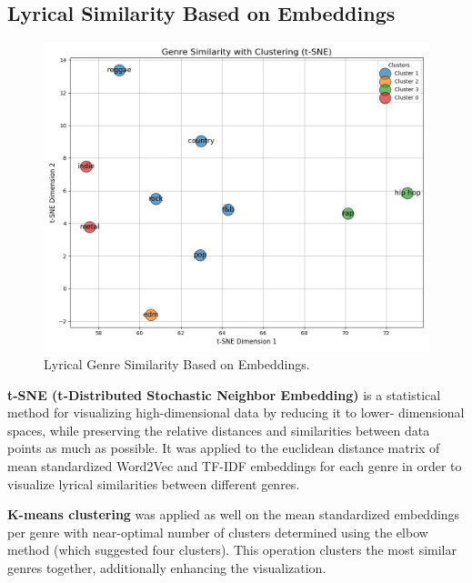 \subsection{Lyrical Similarity Based on Embeddings}
\begin{center}
\begin{figure}[H]
  \centering
  \includegraphics[width=6in]{img/tsne_genres.png}
  \caption{Lyrical Genre Similarity Based on Embeddings.}
  \label{Figure:dendrogram_spotify_features}
\end{figure}
\end{center}
\textbf{t-SNE (t-Distributed Stochastic Neighbor Embedding)} is a statistical method for
visualizing high-dimensional data by reducing it to lower- dimensional spaces,
while preserving the relative distances and similarities between data points as
much as possible. It was applied to the euclidean distance matrix of mean
standardized Word2Vec and TF-IDF embeddings for each genre in order to
visualize lyrical similarities between different genres.

\textbf{K-means clustering} was applied as well on the mean standardized
embeddings per genre with near-optimal number of clusters determined using the
elbow method (which suggested four clusters). This operation clusters the most
similar genres together, additionally enhancing the visualization.


